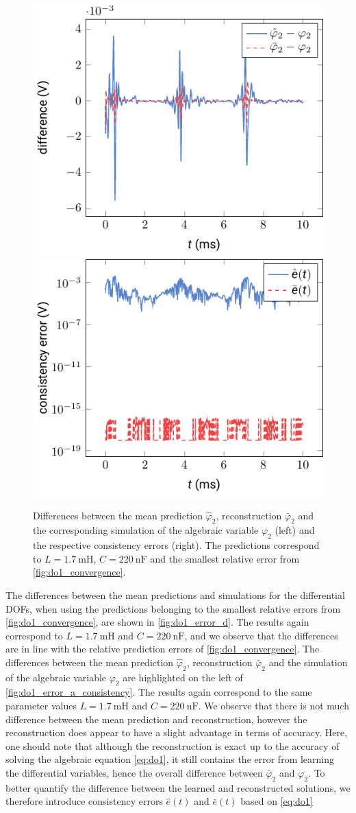 \documentclass[AMA,STIX1COL]{WileyNJD-v2}
\begin{document}
\begin{figure}[b]
    \begin{center}
        \includegraphics[width=.4\textwidth]{do1_error_phi_2} \hspace{1.5cm} \includegraphics[width=.4\textwidth]{do1_consistency}
    \end{center}
    \caption{Differences between the mean prediction $\hat{\varphi}_2$, reconstruction $\bar{\varphi}_2$ and the corresponding simulation of the algebraic variable $\varphi_2$ (left) and the respective consistency errors (right). The predictions correspond to $L = \SI{1.7}{\milli\henry}$, $C = \SI{220}{\nano\farad}$ and the smallest relative error from \autoref{fig:do1_convergence}.}
    \label{fig:do1_error_a_consistency}
\end{figure}
The differences between the mean predictions and simulations for the differential DOFs, when using the predictions belonging to the smallest relative errors from \autoref{fig:do1_convergence}, are shown in \autoref{fig:do1_error_d}. The results again correspond to $L = \SI{1.7}{\milli\henry}$ and $C = \SI{220}{\nano\farad}$, and we observe that the differences are in line with the relative prediction errors of \autoref{fig:do1_convergence}. The differences between the mean prediction $\hat{\varphi}_2$, reconstruction $\bar{\varphi}_2$ and the simulation of the algebraic variable $\varphi_2$ are highlighted on the left of \autoref{fig:do1_error_a_consistency}. The results again correspond to the same parameter values $L = \SI{1.7}{\milli\henry}$ and $C = \SI{220}{\nano\farad}$. We observe that there is not much difference between the mean prediction and reconstruction, however the reconstruction does appear to have a slight advantage in terms of accuracy. Here, one should note that although the reconstruction is exact up to the accuracy of solving the algebraic equation \eqref{eq:do1}, it still contains the error from learning the differential variables, hence the overall difference between $\bar{\varphi}_2$ and $\varphi_2$. To better quantify the difference between the learned and reconstructed solutions, we therefore introduce consistency errors $\hat{e}(t)$ and $\bar{e}(t)$ based on \eqref{eq:do1}
\end{document}
